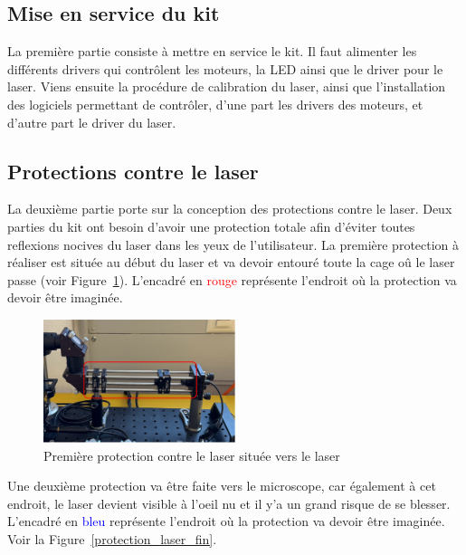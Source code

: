 \subsection{Mise en service du kit}

La première partie consiste à mettre en service le kit. Il faut alimenter les différents drivers qui contrôlent les moteurs, la LED ainsi que le driver pour le laser. Viens ensuite la procédure de calibration du laser, ainsi que l'installation des logiciels permettant de contrôler, d'une part les drivers des moteurs, et d'autre part le driver du laser.
\subsection{Protections contre le laser}
La deuxième partie porte sur la conception des protections contre le laser. Deux parties du kit ont besoin d'avoir une protection totale afin d'éviter toutes reflexions nocives du laser dans les yeux de l'utilisateur. La première protection à réaliser est située au début du laser et va devoir entouré toute la cage oû le laser passe (voir Figure~\ref{protection_laser_début}). L'encadré en \textcolor{red}{rouge} représente l'endroit où la protection va devoir être imaginée.

\begin{figure}[H]
    \begin{center}
        \includegraphics[width=0.5\textwidth]{assets/figures/Introduction/protection_debut_laser.png}
    \end{center}
    \caption{Première protection contre le laser située vers le laser}
    \label{protection_laser_début}
\end{figure}

Une deuxième protection va être faite vers le microscope, car également à cet endroit, le laser devient visible à l'oeil nu et il y'a un grand risque de se blesser. L'encadré en \textcolor{blue}{bleu} représente l'endroit où la protection va devoir être imaginée. Voir la Figure~\ref{protection_laser_fin}.

